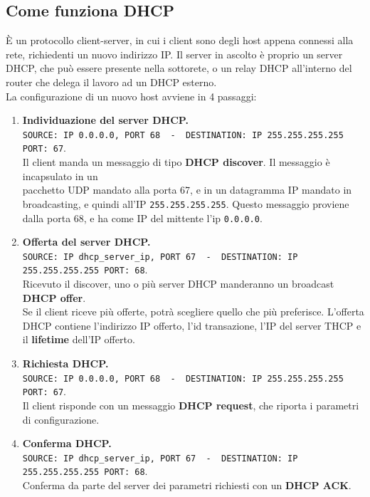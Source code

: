 \subsection{Come funziona DHCP}
È un protocollo client-server, in cui i client sono degli host appena connessi alla rete, richiedenti un nuovo indirizzo IP. Il server in ascolto è proprio un server DHCP, che può essere presente nella sottorete, o un relay DHCP all'interno del router che delega il lavoro ad un DHCP esterno.\\
La configurazione di un nuovo host avviene in 4 passaggi:

\begin{enumerate}
	\item \textbf{Individuazione del server DHCP.}\\
	\verb|SOURCE: IP 0.0.0.0, PORT 68  -  DESTINATION: IP 255.255.255.255 PORT: 67|.\\
	Il client manda un messaggio di tipo \textbf{DHCP discover}.
	Il messaggio è incapsulato in un \\pacchetto UDP mandato alla porta 67, e in un datagramma IP mandato in broadcasting, e quindi all'IP \verb|255.255.255.255|. Questo messaggio proviene dalla porta 68, e ha come IP del mittente l'ip \verb|0.0.0.0|.
	
	\item \textbf{Offerta del server DHCP.}\\
	\verb|SOURCE: IP dhcp_server_ip, PORT 67  -  DESTINATION: IP 255.255.255.255 PORT: 68|.\\
	Ricevuto il discover, uno o più server DHCP manderanno un broadcast \textbf{DHCP offer}.\\
	Se il client riceve più offerte, potrà scegliere quello che più preferisce. 
	L'offerta DHCP contiene l'indirizzo IP offerto, l'id transazione, l'IP del server THCP e il \textbf{lifetime} dell'IP offerto.
	
	\item \textbf{Richiesta DHCP.}\\
	\verb|SOURCE: IP 0.0.0.0, PORT 68  -  DESTINATION: IP 255.255.255.255 PORT: 67|.\\
	Il client risponde con un messaggio \textbf{DHCP request}, che riporta i parametri di configurazione.
	
	\item \textbf{Conferma DHCP.}\\
	\verb|SOURCE: IP dhcp_server_ip, PORT 67  -  DESTINATION: IP 255.255.255.255 PORT: 68|.\\
	Conferma da parte del server dei parametri richiesti con un \textbf{DHCP ACK}.
\end{enumerate}

